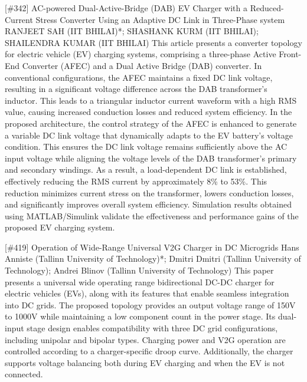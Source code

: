 {} \begin{abstract_online} {[\#342] AC-powered Dual-Active-Bridge (DAB) EV Charger with a Reduced-Current Stress Converter Using an Adaptive DC Link in Three-Phase system} {} {RANJEET SAH (IIT BHILAI)*; SHASHANK KURM (IIT BHILAI); SHAILENDRA KUMAR (IIT BHILAI)} {}  This article presents a converter topology for electric vehicle (EV) charging systems, comprising a three-phase Active Front-End Converter (AFEC) and a Dual Active Bridge (DAB) converter. In conventional configurations, the AFEC maintains a fixed DC link voltage, resulting in a significant voltage difference across the DAB transformer's inductor. This leads to a triangular inductor current waveform with a high RMS value, causing increased conduction losses and reduced system efficiency. In the proposed architecture, the control strategy of the AFEC is enhanced to generate a variable DC link voltage that dynamically adapts to the EV battery's voltage condition. This ensures the DC link voltage remains sufficiently above the AC input voltage while aligning the voltage levels of the DAB transformer's primary and secondary windings. As a result, a load-dependent DC link is established, effectively reducing the RMS current by approximately 8\% to 53\%. This reduction minimizes current stress on the transformer, lowers conduction losses, and significantly improves overall system efficiency. Simulation results obtained using MATLAB/Simulink validate the effectiveness and performance gains of the proposed EV charging system.  \end{abstract_online} 
{} \begin{abstract_online} {[\#419] Operation of Wide-Range Universal V2G Charger in DC Microgrids} {} {Hans Anniste (Tallinn University of Technology)*; Dmitri Dmitri (Tallinn University of Technology); Andrei Blinov (Tallinn University of Technology)} {} This paper presents a universal wide operating range bidirectional DC-DC charger for electric vehicles (EVs), along with its features that enable seamless integration into DC grids. The proposed topology provides an output voltage range of 150V to 1000V while maintaining a low component count in the power stage. Its dual-input stage design enables compatibility with three DC grid configurations, including unipolar and bipolar types. Charging power and V2G operation are controlled according to a charger-specific droop curve. Additionally, the charger supports voltage balancing both during EV charging and when the EV is not connected. \end{abstract_online} 
